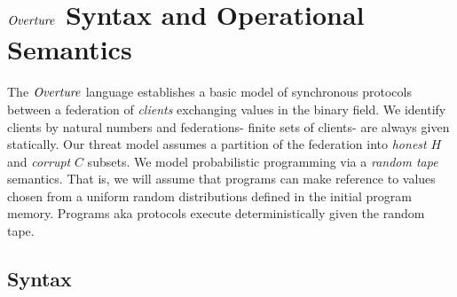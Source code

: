 \section{$\mathit{Overture}$ Syntax and Operational Semantics}
\label{section-lang}

The $\mathit{Overture}$ language establishes a basic model of synchronous
protocols between a federation of \emph{clients} exchanging values in
the binary field. We identify clients by natural numbers and federations- finite sets of
clients- are always given statically.  Our threat model assumes a
partition of the federation into \emph{honest} $H$ and \emph{corrupt}
$C$ subsets. We model probabilistic programming via a \emph{random
tape} semantics. That is, we will assume that programs can make
reference to values chosen from a uniform random distributions defined
in the initial program memory.  Programs aka protocols execute
deterministically given the random tape.

\subsection{Syntax}

\minicatsyntaxfig

